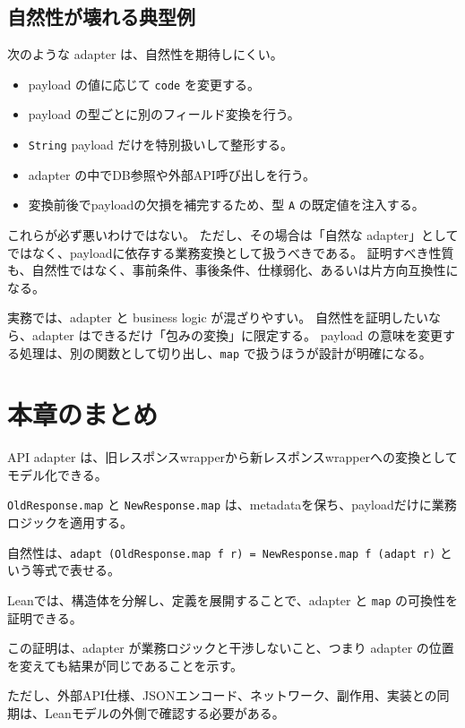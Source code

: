 \subsection{自然性が壊れる典型例}

次のような adapter は、自然性を期待しにくい。

\begin{itemize}
\item payload の値に応じて \texttt{code} を変更する。
\item payload の型ごとに別のフィールド変換を行う。
\item \texttt{String} payload だけを特別扱いして整形する。
\item adapter の中でDB参照や外部API呼び出しを行う。
\item 変換前後でpayloadの欠損を補完するため、型 \texttt{A} の既定値を注入する。
\end{itemize}

これらが必ず悪いわけではない。
ただし、その場合は「自然な adapter」としてではなく、payloadに依存する業務変換として扱うべきである。
証明すべき性質も、自然性ではなく、事前条件、事後条件、仕様弱化、あるいは片方向互換性になる。

\begin{warningbox}
実務では、adapter と business logic が混ざりやすい。
自然性を証明したいなら、adapter はできるだけ「包みの変換」に限定する。
payload の意味を変更する処理は、別の関数として切り出し、\texttt{map} で扱うほうが設計が明確になる。
\end{warningbox}

\section{本章のまとめ}

API adapter は、旧レスポンスwrapperから新レスポンスwrapperへの変換としてモデル化できる。

\texttt{OldResponse.map} と \texttt{NewResponse.map} は、metadataを保ち、payloadだけに業務ロジックを適用する。

自然性は、\texttt{adapt (OldResponse.map f r) = NewResponse.map f (adapt r)} という等式で表せる。

Leanでは、構造体を分解し、定義を展開することで、adapter と \texttt{map} の可換性を証明できる。

この証明は、adapter が業務ロジックと干渉しないこと、つまり adapter の位置を変えても結果が同じであることを示す。

ただし、外部API仕様、JSONエンコード、ネットワーク、副作用、実装との同期は、Leanモデルの外側で確認する必要がある。
